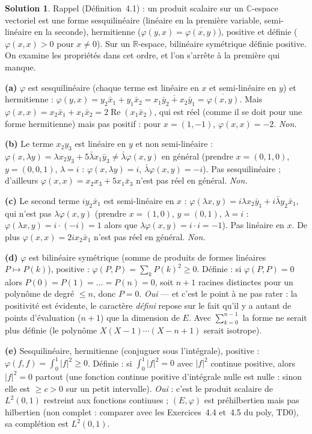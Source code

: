 \documentclass[11pt,a4paper]{article}
\newcommand{\R}{\mathbb{R}}
\newcommand{\C}{\mathbb{C}}
\renewcommand{\Re}{\operatorname{Re}}
\theoremstyle{definition}
\newtheorem*{solution}{Solution}
\begin{document}
\begin{solution}
Rappel (Définition~4.1) : un produit scalaire sur un $\C$-espace vectoriel est une forme sesquilinéaire (linéaire en la première variable, semi-linéaire en la seconde), hermitienne ($\varphi(y,x)=\overline{\varphi(x,y)}$), positive et définie ($\varphi(x,x)>0$ pour $x\ne0$). Sur un $\R$-espace, bilinéaire symétrique définie positive. On examine les propriétés dans cet ordre, et l'on s'arrête à la première qui manque.

\medskip
\noindent\textbf{(a)} $\varphi$ est sesquilinéaire (chaque terme est linéaire en $x$ et semi-linéaire en $y$) et hermitienne : $\varphi(y,x)=y_2\bar x_1+y_1\bar x_2=\overline{x_1\bar y_2+x_2\bar y_1}=\overline{\varphi(x,y)}$. Mais $\varphi(x,x)=x_2\bar x_1+x_1\bar x_2=2\Re(x_1\bar x_2)$, qui est réel (comme il se doit pour une forme hermitienne) mais pas positif : pour $x=(1,-1)$, $\varphi(x,x)=-2$. \emph{Non.}

\medskip
\noindent\textbf{(b)} Le terme $x_2y_3$ est linéaire en $y$ et non semi-linéaire : $\varphi(x,\lambda y)=\lambda x_2y_3+5\bar\lambda x_1\bar y_3\ne\bar\lambda\varphi(x,y)$ en général (prendre $x=(0,1,0)$, $y=(0,0,1)$, $\lambda=i$ : $\varphi(x,\lambda y)=i$, $\bar\lambda\varphi(x,y)=-i$). Pas sesquilinéaire ; d'ailleurs $\varphi(x,x)=x_2x_3+5x_1\bar x_3$ n'est pas réel en général. \emph{Non.}

\medskip
\noindent\textbf{(c)} Le second terme $iy_2\bar x_1$ est semi-linéaire en $x$ : $\varphi(\lambda x,y)=i\lambda x_2\bar y_1+i\bar\lambda y_2\bar x_1$, qui n'est pas $\lambda\varphi(x,y)$ (prendre $x=(1,0)$, $y=(0,1)$, $\lambda=i$ : $\varphi(\lambda x,y)=i\cdot(-i)=1$ alors que $\lambda\varphi(x,y)=i\cdot i=-1$). Pas linéaire en $x$. De plus $\varphi(x,x)=2ix_2\bar x_1$ n'est pas réel en général. \emph{Non.}

\medskip
\noindent\textbf{(d)} $\varphi$ est bilinéaire symétrique (somme de produits de formes linéaires $P\mapsto P(k)$), positive : $\varphi(P,P)=\sum_kP(k)^2\ge0$. Définie : si $\varphi(P,P)=0$ alors $P(0)=P(1)=\dots=P(n)=0$, soit $n+1$ racines distinctes pour un polynôme de degré $\le n$, donc $P=0$. \emph{Oui} — et c'est le point à ne pas rater : la positivité est évidente, le caractère \emph{défini} repose sur le fait qu'il y a autant de points d'évaluation ($n+1$) que la dimension de $E$. Avec $\sum_{k=0}^{n-1}$ la forme ne serait plus définie (le polynôme $X(X-1)\cdots(X-n+1)$ serait isotrope).

\medskip
\noindent\textbf{(e)} Sesquilinéaire, hermitienne (conjuguer sous l'intégrale), positive : $\varphi(f,f)=\int_0^1|f|^2\ge0$. Définie : si $\int_0^1|f|^2=0$ avec $|f|^2$ continue positive, alors $|f|^2=0$ partout (une fonction continue positive d'intégrale nulle est nulle : sinon elle est $\ge c>0$ sur un petit intervalle). \emph{Oui} : c'est le produit scalaire de $L^2(0,1)$ restreint aux fonctions continues ; $(E,\varphi)$ est préhilbertien mais pas hilbertien (non complet : comparer avec les Exercices~4.4 et~4.5 du poly, TD0), sa complétion est $L^2(0,1)$.
\end{solution}
\end{document}
